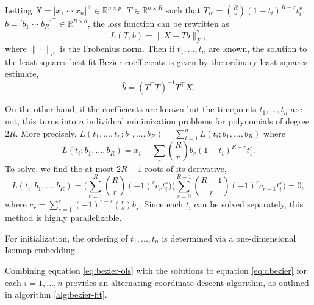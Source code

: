 \documentclass[12pt]{article}
\begin{document}
Letting
\(X = \bigl[ x_1 \; \cdots \; x_n \bigr]^\top \in \mathbb{R}^{n \times p}\),
\(T \in \mathbb{R}^{n \times R}\) such that
\(T_{ir} = \binom{R}{r} (1-t_i)^{R-r} t_i^r\),
\(b = \bigl[b_1 \; \cdots \; b_R\bigr]^\top \in \mathbb{R}^{R \times d}\),
the loss function can be rewritten as \begin{equation}
\label{eq:bezier-loss}
L(T, b) = \|X - T b\|_F^2,
\end{equation} where \(\|\cdot\|_F\) is the Frobenius norm. Then if
\(t_1, ..., t_n\) are known, the solution to the least squares best fit
Bezier coefficients is given by the ordinary least squares estimate,
\begin{equation}
\label{eq:bezier-ols}
\hat{b} = (T^\top T)^{-1} T^\top X.
\end{equation}

On the other hand, if the coefficients are known but the timepoints
\(t_1, ..., t_n\) are not, this turns into \(n\) individual minimization
problems for polynomials of degree \(2 R\). More precisely,
\(L(t_1, ..., t_n; b_1, ..., b_R) = \sum_{i=1}^n L(t_i; b_1, ..., b_R)\)
where \begin{equation}
\label{eq:bezier-ls}
L(t_i; b_1, ..., b_R) = x_i - \sum_r \binom{R}{r} b_r (1-t_i)^{R-r} t_i^r. 
\end{equation} To solve, we find the at most \(2 R - 1\) roots of its
derivative, \begin{equation}
\label{eq:dbezier}
\dot{L}(t_i; b_1, ..., b_R) = \bigg(\sum_{r=1}^R \binom{R}{r} (-1)^r c_r t_i^r \bigg) \bigg(\sum_{r=0}^{R-1} \binom{R-1}{r} (-1)^r c_{r+1} t_i^r \bigg) = 0,
\end{equation} where \(c_r = \sum_{s=1}^r (-1)^{r-s} \binom{r}{s} b_s\).
Since each \(t_i\) can be solved separately, this method is highly
parallelizable.

For initialization, the ordering of \(t_1, ..., t_n\) is determined via
a one-dimensional Isomap embedding \citep{Tenenbaum2000-ff}.

Combining equation \ref{eq:bezier-ols} with the solutions to equation
\ref{eq:dbezier} for each \(i = 1, ..., n\) provides an alternating
coordinate descent algorithm, as outlined in algorithm
\ref{alg:bezier-fit}.
\end{document}
